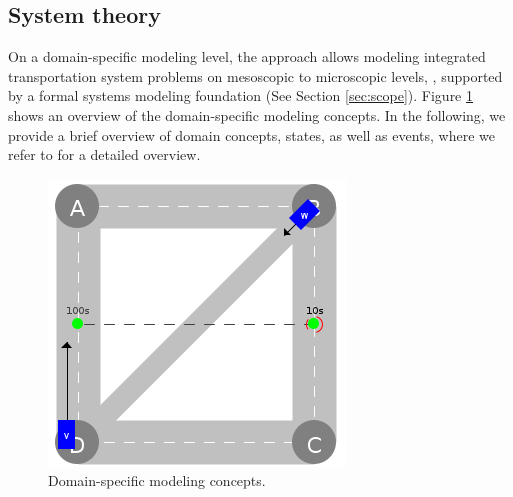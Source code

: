 \documentclass[a4paper,twoside]{article}
\begin{document}
	
	
	\subsection{System theory}
	\label{sec:domain-specific-modeling}
	
	
	On a domain-specific modeling level, the approach allows modeling integrated transportation system problems on mesoscopic to microscopic levels, \cite{ascher_hackenberg_2014,ascher_hackenberg_2015}, supported by a formal systems modeling foundation \cite{ascher_hackenberg_2016,ascher_hackenberg_2017} (See Section  \ref{sec:scope}). 
	Figure \ref{fig:domain-specific-modeling} shows an overview of the domain-specific modeling concepts. In the following, we provide a brief overview of domain concepts, states, as well as events, where we refer to \cite{ascher2023discrete} for a detailed overview. 
	\begin{figure}[!ht]
		\centering
		\includegraphics[width=0.6\columnwidth]{../../events/demand.png}
		\caption{Domain-specific modeling concepts.}
		\label{fig:domain-specific-modeling}
	\end{figure}
	
\end{document}
